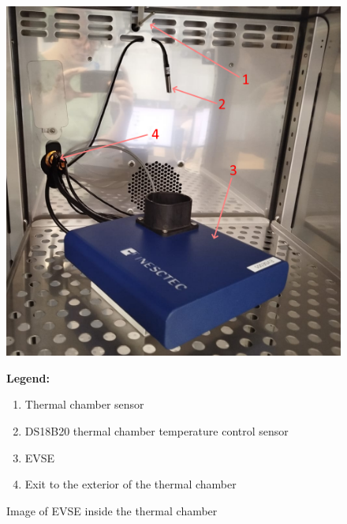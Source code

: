 \begin{figure}[H]
    \centering
    \begin{minipage}{0.6\textwidth}
        \includegraphics[width=\linewidth]{figures/inst_inside_1.png}
    \end{minipage}%
    \hfill
    \begin{minipage}{0.35\textwidth}
        \small
        \textbf{Legend:}
        \begin{enumerate}
            \item Thermal chamber sensor
            \item DS18B20 thermal chamber temperature control sensor
            \item EVSE
            \item Exit to the exterior of the thermal chamber
        \end{enumerate}
    \end{minipage}
    \caption{Image of EVSE inside the thermal chamber}
    \label{fig:inst_inside_1}
\end{figure}

